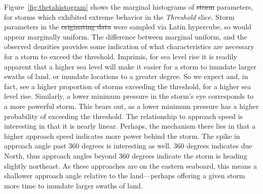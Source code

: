 Figure~\ref{fig:thetahistogram} shows the marginal histograms of \st{storm}  parameters, for 
    storms which exhibited extreme behavior in the \emph{Threshold} slice.  Storm parameters 
    in the \st{originating data}  were sampled via Latin hypercube, so would appear marginally
    uniform.  The difference between marginal uniform, and the observed densities provides
    some indication of what characteristics are necessary for a storm to exceed the threshold.
    Imprimis, for sea level rise it is readily apparent that a higher sea level will
    make it easier for a storm to inundate larger swaths of land, or inundate locations to a
    greater degree.  So we expect and, in fact, see a higher proportion of storms exceeding
    the threshold, for a higher sea level rise.  Similarly, a lower minimum pressure in the storm's
    eye corresponds to a more powerful storm.  This bears out, as a lower minimum pressure has
    a higher probability of exceeding the threshold.  The relationship to approach speed is 
    interesting in that it is nearly linear.  Perhaps, the mechanism there lies in that a higher
    approach speed indicates more power behind the storm.  The spike in approach angle past 360
    degrees is interesting as well. 360 degrees indicates due North, thus approach angles 
    beyond 360 degrees indicate the storm is heading slightly northeast. As these approaches are
    on the eastern seaboard, this means a shallower approach angle relative to the
    land---perhaps offering a given storm more time to inundate larger swaths of land.

